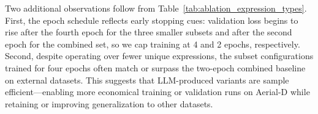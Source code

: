 \begin{table}[t]
\centering
\caption{Expression Enhancement Ablation Across Four Datasets}
\label{tab:ablation_expression_types}
\end{table}

Two additional observations follow from Table~\ref{tab:ablation_expression_types}. First, the epoch schedule reflects early stopping cues: validation loss begins to rise after the fourth epoch for the three smaller subsets and after the second epoch for the combined set, so we cap training at 4 and 2 epochs, respectively. Second, despite operating over fewer unique expressions, the subset configurations trained for four epochs often match or surpass the two-epoch combined baseline on external datasets. This suggests that LLM-produced variants are sample efficient—enabling more economical training or validation runs on Aerial-D while retaining or improving generalization to other datasets.


